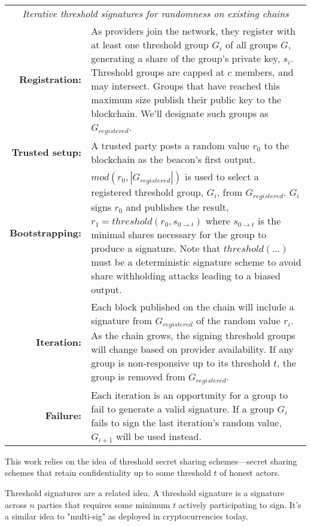 \documentclass[11pt]{article}
\begin{document}
\begin{table*}[t]
  \centering
  \begin{tabular}{|rp{10cm}|}
  \hline
  \multicolumn{2}{|c|}{\textit{Iterative threshold signatures for
  randomness on existing chains}} \\
  \textbf{Registration:} & As providers join the network, they
  register with at least one threshold group $G_i$ of all groups $G$,
  generating a share of the group's private key, $s_i$. Threshold groups are
  capped at $c$ members, and may intersect. Groups that have reached
  this maximum size publish their public key to the blockchain. We'll
  designate such groups as $G_{registered}$. \\
  \textbf{Trusted setup:} & A trusted party posts a random value
  $r_0$ to the blockchain as the beacon's first output. \\
  \textbf{Bootstrapping:} & $mod(r_{0}, |G_{registered}|)$ is
  used to select a registered threshold group, $G_i$, from
  $G_{registered}$. $G_i$ signs $r_0$ and publishes the
  result, $r_1 = threshold(r_0, s_{0\rightarrow{t}})$ where
  $s_{0\rightarrow{t}}$ is the minimal shares necessary for the group
  to produce a signature. Note that $threshold(...)$ must be a
  deterministic signature scheme to avoid share withholding attacks
  leading to a biased output. \\
  \textbf{Iteration:} & Each block published on the chain will include
  a signature from $G_{registered}$ of the random value $r_i$. As the
  chain grows, the signing threshold groups will change based on
  provider availability. If any group is non-responsive up to its
  threshold $t$, the group is removed from $G_{registered}$. \\
  \textbf{Failure:} & Each iteration is an opportunity for a
  group to fail to generate a valid signature. If a group $G_i$ fails
  to sign the last iteration's random value, $G_{i+1}$ will be used
  instead. \\
  \hline
\end{tabular}
\end{table*}

This work relies on the idea of threshold secret sharing schemes---secret
sharing schemes that retain confidentiality up to some threshold $t$ of
honest actors.

Threshold signatures are a related idea. A threshold signature is a
signature across $n$ parties that requires some minimum $t$ actively
participating to sign. It's a similar idea to "multi-sig" as deployed
in cryptocurrencies today.
\end{document}
